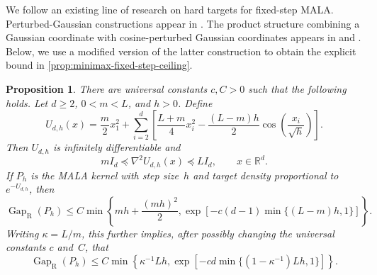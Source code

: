 \documentclass[11pt]{article}
\newtheorem{proposition}[proposition]{Proposition}
\newcommand{\R}{\mathbb R}
\newcommand{\Gap}{\operatorname{Gap}_{\mathrm{R}}}
\newcommand{\1}{\mathbf 1}
\begin{document}
	
	We follow an existing line of research on hard targets for fixed-step
	MALA. Perturbed-Gaussian constructions appear in
	\citet[Theorems~8, 9, and~36]{ChewiEtAl2021}.
	The product structure combining a Gaussian coordinate with
	cosine-perturbed Gaussian coordinates appears in
	\citet[Supplement, equation~(20)]{LeeShenTian2021} and
	\citet[Equation~(28) and Lemma~8]{WuSchmidlerChen2022}.
	Below, we use a modified version of the latter construction to obtain
	the explicit bound in \cref{prop:minimax-fixed-step-ceiling}.
	
	
	\begin{proposition}
		\label{prop:generic-fixed-step-obstruction}
		There are universal constants $c,C>0$ such that the following holds.
		Let $d\geq2$, $0<m<L$, and $h>0$.  Define
		\begin{equation}
			\label{eq:generic-hard-potential}
			U_{d,h}(x)
			=\frac{m}{2}x_1^2
			+\sum_{i=2}^d\left[
			\frac{L+m}{4}x_i^2
			-\frac{(L-m)h}{2}
			\cos\left(\frac{x_i}{\sqrt h}\right)
			\right].
		\end{equation}
		Then $U_{d,h}$ is infinitely differentiable and
		\begin{equation}
			\label{eq:generic-hard-curvature}
			mI_d\preceq\nabla^2U_{d,h}(x)\preceq LI_d,
			\qquad x\in\R^d.
		\end{equation}
		If $P_h$ is the MALA kernel with step size~$h$ and target density
		proportional to $e^{-U_{d,h}}$, then
		\begin{equation}
			\label{eq:generic-fixed-step-gap-upper}
			\Gap(P_h)
			\leq
			C\min\left\{
			mh+\frac{(mh)^2}{2},
			\exp\left[
			-c(d-1)\min\{(L-m)h,1\}
			\right]
			\right\}.
		\end{equation}
		Writing $\kappa=L/m$, this further implies, after possibly changing
		the universal constants $c$ and~$C$, that
		\begin{equation}
			\label{eq:generic-fixed-step-gap-upper-kappa}
			\Gap(P_h)
			\leq
			C\min\left\{
			\kappa^{-1}Lh,
			\exp\left[
			-cd\min\{(1-\kappa^{-1})Lh,1\}
			\right]
			\right\}.
		\end{equation}
	\end{proposition}
	
\end{document}
